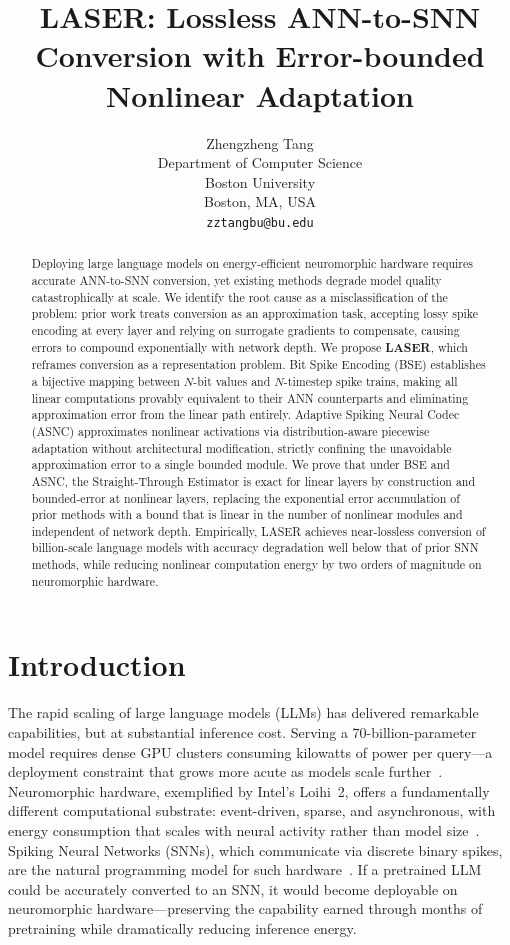\documentclass{article}
\title{LASER: Lossless ANN-to-SNN Conversion with Error-bounded Nonlinear Adaptation}
\author{%
  Zhengzheng Tang \\
  Department of Computer Science\\
  Boston University\\
  Boston, MA, USA \\
  \texttt{zztangbu@bu.edu} \\
}
\theoremstyle{plain}
\theoremstyle{definition}
\theoremstyle{remark}
\begin{document}
\maketitle

\begin{abstract}
Deploying large language models on energy-efficient neuromorphic hardware requires
accurate ANN-to-SNN conversion, yet existing methods degrade model quality
catastrophically at scale. We identify the root cause as a misclassification of the
problem: prior work treats conversion as an approximation task, accepting lossy spike
encoding at every layer and relying on surrogate gradients to compensate, causing
errors to compound exponentially with network depth. We propose \textbf{LASER}, which
reframes conversion as a representation problem. Bit Spike Encoding (BSE) establishes
a bijective mapping between $N$-bit values and $N$-timestep spike trains, making all
linear computations provably equivalent to their ANN counterparts and eliminating
approximation error from the linear path entirely. Adaptive Spiking Neural Codec
(ASNC) approximates nonlinear activations via distribution-aware piecewise adaptation
without architectural modification, strictly confining the unavoidable approximation
error to a single bounded module. We prove that under BSE and ASNC, the
Straight-Through Estimator is exact for linear layers by construction and
bounded-error at nonlinear layers, replacing the exponential error accumulation of
prior methods with a bound that is linear in the number of nonlinear modules and
independent of network depth. Empirically, LASER achieves near-lossless conversion of
billion-scale language models with accuracy degradation well below that of prior SNN
methods, while reducing nonlinear computation energy by two orders of magnitude on
neuromorphic hardware.
\end{abstract}

\section{Introduction}
\label{sec:introduction}

The rapid scaling of large language models (LLMs) has delivered remarkable capabilities, but at substantial inference cost. Serving a 70-billion-parameter model requires dense GPU clusters consuming kilowatts of power per query—a deployment constraint that grows more acute as models scale further~\citep{tay2022efficient}. Neuromorphic hardware, exemplified by Intel's Loihi~2, offers a fundamentally different computational substrate: event-driven, sparse, and asynchronous, with energy consumption that scales with neural activity rather than model size~\citep{davies2018loihi,davies2021loihi}. Spiking Neural Networks (SNNs),
which communicate via discrete binary spikes, are the natural programming model for such hardware~\citep{maass1997networks,roy2019towards}. If a pretrained LLM could be accurately converted to an SNN, it would become deployable on neuromorphic hardware—preserving the capability earned through months of pretraining while dramatically reducing inference energy.
\end{document}
